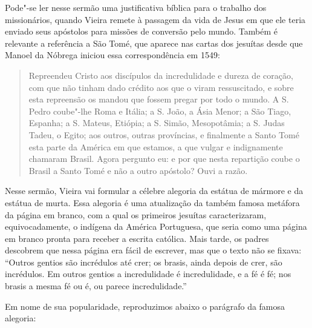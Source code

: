 Pode"-se ler nesse sermão uma justificativa bíblica para o trabalho dos
missionários, quando Vieira remete à passagem da vida de Jesus em que
ele teria enviado seus apóstolos para missões de conversão pelo mundo.
Também é relevante a referência a São Tomé, que aparece nas cartas dos
jesuítas desde que Manoel da Nóbrega iniciou essa correspondência em
1549:

\begin{quote}
Repreendeu Cristo aos discípulos da incredulidade e dureza de coração,
com que não tinham dado crédito aos que o viram ressuscitado, e sobre
esta repreensão os mandou que fossem pregar por todo o mundo. A S. Pedro
coube"-lhe Roma e Itália; a S. João, a Ásia Menor; a São Tiago, Espanha;
a S. Mateus, Etiópia; a S. Simão, Mesopotâmia; a S. Judas Tadeu, o
Egito; aos outros, outras províncias, e finalmente a Santo Tomé esta
parte da América em que estamos, a que vulgar e indignamente chamaram
Brasil. Agora pergunto eu: e por que nesta repartição coube o Brasil a
Santo Tomé e não a outro apóstolo? Ouvi a razão.
\end{quote}

Nesse sermão, Vieira vai formular a célebre alegoria da estátua de
mármore e da estátua de murta. Essa alegoria é uma atualização da também
famosa metáfora da página em branco, com a qual os primeiros jesuítas
caracterizaram, equivocadamente, o indígena da América Portuguesa, que
seria como uma página em branco pronta para receber a escrita católica.
Mais tarde, os padres descobrem que nessa página era fácil de escrever,
mas que o texto não se fixava: ``Outros gentios são incrédulos até crer;
os brasis, ainda depois de crer, são incrédulos. Em outros gentios a
incredulidade é incredulidade, e a fé é fé; nos brasis a mesma fé ou é,
ou parece incredulidade.''

Em nome de sua popularidade, reproduzimos abaixo o parágrafo da famosa
alegoria:

